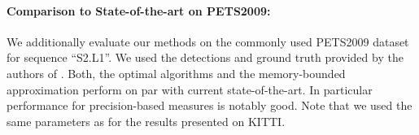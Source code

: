 \documentclass[10pt,twocolumn,letterpaper]{article}
\begin{document}
\begin{table}\setlength{\tabcolsep}{7.5pt}
  \caption{Comparison of our proposed method to three baselines on PETS 2009 sequence ``S2.L1''.
}
  \label{table:compare_tracking_PETS}
\vspace{0.25cm}
\end{table}

\paragraph{Comparison to  State-of-the-art on PETS2009:}
We additionally evaluate our methods on the commonly used PETS2009 dataset for sequence ``S2.L1''. We used the detections and ground truth provided by the authors of \cite{Andriyenko2011CVPR,Andriyenko2012CVPR,Milan2014PAMI}. Both, the optimal algorithms and the memory-bounded approximation perform on par with current state-of-the-art. In particular performance for precision-based measures is notably good. Note that we used the same parameters as for the results presented on KITTI.
\end{document}
